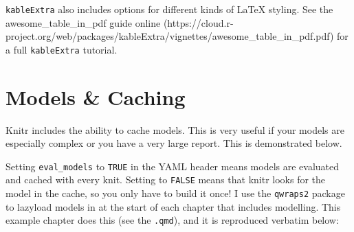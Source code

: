 \documentclass[../main.tex]{subfiles}
\begin{document}
\texttt{kableExtra} also includes options for different kinds of LaTeX
styling. See the awesome\_table\_in\_pdf guide online
(https://cloud.r-project.org/web/packages/kableExtra/vignettes/awesome\_table\_in\_pdf.pdf)
for a full \texttt{kableExtra} tutorial.

\section{Models \& Caching}\label{models-caching}

Knitr includes the ability to cache models. This is very useful if your
models are especially complex or you have a very large report. This is
demonstrated below.

\begin{Shaded}
\begin{Highlighting}[]
\NormalTok{(}\NormalTok{)                               }
\OtherTok{\textless{}{-}} \SpecialCharTok{:}                                  
\OtherTok{\textless{}{-}}  \SpecialCharTok{*}\SpecialCharTok{+} \NormalTok{(}\NormalTok{, } \NormalTok{, } \NormalTok{)  }

\OtherTok{\textless{}{-}} 

\OtherTok{\textless{}{-}} \SpecialCharTok{\textasciitilde{}}

\end{Highlighting}
\end{Shaded}

Setting \texttt{eval\_models} to \texttt{TRUE} in the YAML header means
models are evaluated and cached with every knit. Setting to
\texttt{FALSE} means that knitr looks for the model in the cache, so you
only have to build it once! I use the \texttt{qwraps2} package to
lazyload models in at the start of each chapter that includes modelling.
This example chapter does this (see the \texttt{.qmd}), and it is
reproduced verbatim below:
\end{document}
